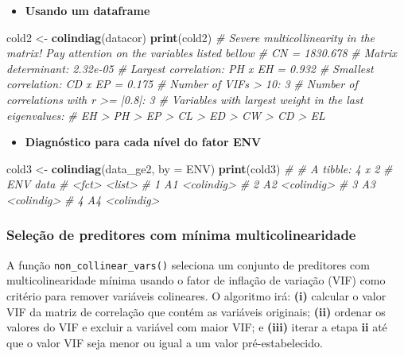 \documentclass[
]{book}
\newenvironment{Shaded}{\begin{snugshade}}{\end{snugshade}}
\newcommand{\CommentTok}[1]{\textcolor[rgb]{0.56,0.35,0.01}{\textit{#1}}}
\newcommand{\DataTypeTok}[1]{\textcolor[rgb]{0.13,0.29,0.53}{#1}}
\newcommand{\KeywordTok}[1]{\textcolor[rgb]{0.13,0.29,0.53}{\textbf{#1}}}
\newcommand{\NormalTok}[1]{#1}
\newcommand{\StringTok}[1]{\textcolor[rgb]{0.31,0.60,0.02}{#1}}
\providecommand{\tightlist}{%
  \setlength{\itemsep}{0pt}\setlength{\parskip}{0pt}}
\begin{document}
\begin{itemize}
\tightlist
\item
  \textbf{Usando um dataframe}
\end{itemize}

\begin{Shaded}
\begin{Highlighting}[]
\NormalTok{cold2 <-}\StringTok{ }\KeywordTok{colindiag}\NormalTok{(datacor)}
\KeywordTok{print}\NormalTok{(cold2)}
\CommentTok{# Severe multicollinearity in the matrix! Pay attention on the variables listed bellow}
\CommentTok{# CN = 1830.678}
\CommentTok{# Matrix determinant: 2.32e-05 }
\CommentTok{# Largest correlation: PH x EH = 0.932 }
\CommentTok{# Smallest correlation: CD x EP = 0.175 }
\CommentTok{# Number of VIFs > 10: 3 }
\CommentTok{# Number of correlations with r >= |0.8|: 3 }
\CommentTok{# Variables with largest weight in the last eigenvalues: }
\CommentTok{# EH > PH > EP > CL > ED > CW > CD > EL}
\end{Highlighting}
\end{Shaded}

\begin{itemize}
\tightlist
\item
  \textbf{Diagnóstico para cada nível do fator ENV}
\end{itemize}

\begin{Shaded}
\begin{Highlighting}[]
\NormalTok{cold3 <-}\StringTok{ }\KeywordTok{colindiag}\NormalTok{(data_ge2, }\DataTypeTok{by =}\NormalTok{ ENV)}
\KeywordTok{print}\NormalTok{(cold3)}
\CommentTok{# # A tibble: 4 x 2}
\CommentTok{#   ENV   data      }
\CommentTok{#   <fct> <list>    }
\CommentTok{# 1 A1    <colindig>}
\CommentTok{# 2 A2    <colindig>}
\CommentTok{# 3 A3    <colindig>}
\CommentTok{# 4 A4    <colindig>}
\end{Highlighting}
\end{Shaded}

\hypertarget{seleuxe7uxe3o-de-preditores-com-muxednima-multicolinearidade}{%
\subsubsection{Seleção de preditores com mínima multicolinearidade}\label{seleuxe7uxe3o-de-preditores-com-muxednima-multicolinearidade}}

A função \texttt{non\_collinear\_vars()} seleciona um conjunto de preditores com multicolinearidade mínima usando o fator de inflação de variação (VIF) como critério para remover variáveis colineares. O algoritmo irá: \textbf{(i)} calcular o valor VIF da matriz de correlação que contém as variáveis originais; \textbf{(ii)} ordenar os valores do VIF e excluir a variável com maior VIF; e \textbf{(iii)} iterar a etapa \textbf{ii} até que o valor VIF seja menor ou igual a um valor pré-estabelecido.
\end{document}
